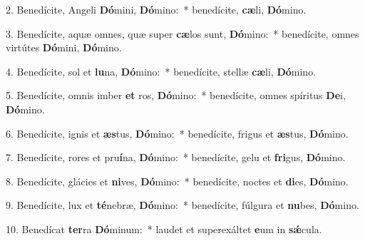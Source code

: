 
2. Benedícite, Angeli \textbf{Dó}mini, \textbf{Dó}mino:~* benedícite, \textbf{cæ}li, \textbf{Dó}mino.

3. Benedícite, aquæ omnes, quæ super \textbf{cæ}los sunt, \textbf{Dó}mino:~* benedícite, omnes virtútes \textbf{Dó}mini, \textbf{Dó}mino.

4. Benedícite, sol et \textbf{lu}na, \textbf{Dó}mino:~* benedícite, stellæ \textbf{cæ}li, \textbf{Dó}mino.

5. Benedícite, omnis imber \textbf{et} ros, \textbf{Dó}mino:~* benedícite, omnes spíritus \textbf{De}i, \textbf{Dó}mino.

6. Benedícite, ignis et \textbf{æs}tus, \textbf{Dó}mino:~* benedícite, frigus et \textbf{æs}tus, \textbf{Dó}mino.

7. Benedícite, rores et pru\textbf{í}na, \textbf{Dó}mino:~* benedícite, gelu et \textbf{fri}gus, \textbf{Dó}mino.

8. Benedícite, glácies et \textbf{ni}ves, \textbf{Dó}mino:~* benedícite, noctes et \textbf{di}es, \textbf{Dó}mino.

9. Benedícite, lux et \textbf{té}nebræ, \textbf{Dó}mino:~* benedícite, fúlgura et \textbf{nu}bes, \textbf{Dó}mino.

10. Benedícat \textbf{ter}ra \textbf{Dó}minum:~* laudet et superexáltet \textbf{e}um in \textbf{s\'{\ae}}cula.

